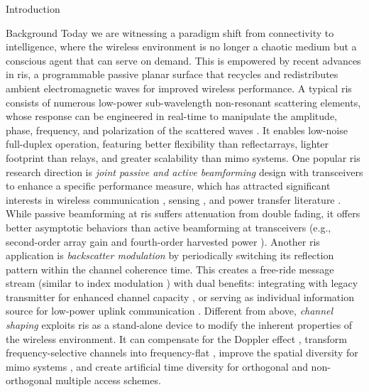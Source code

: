 \documentclass[journal]{IEEEtran}
\begin{document}
\begin{section}{Introduction}
	\begin{subsection}{Background}
		Today we are witnessing a paradigm shift from connectivity to intelligence, where the wireless environment is no longer a chaotic medium but a conscious agent that can serve on demand.
		This is empowered by recent advances in \gls{ris}, a programmable passive planar surface that recycles and redistributes ambient electromagnetic waves for improved wireless performance.
		A typical \gls{ris} consists of numerous low-power sub-wavelength non-resonant scattering elements, whose response can be engineered in real-time to manipulate the amplitude, phase, frequency, and polarization of the scattered waves \cite{Basar2019}.
		It enables low-noise full-duplex operation, featuring better flexibility than reflectarrays, lighter footprint than relays, and greater scalability than \gls{mimo} systems.
		One popular \gls{ris} research direction is \emph{joint passive and active beamforming} design with transceivers to enhance a specific performance measure, which has attracted significant interests in wireless communication \cite{Wu2019,Guo2020,Liu2022}, sensing \cite{He2022,Luo2022,Hua2023}, and power transfer literature \cite{Wu2020a,Feng2022,Zhao2022}.
		While passive beamforming at \gls{ris} suffers attenuation from double fading, it offers better asymptotic behaviors than active beamforming at transceivers (e.g., second-order array gain and fourth-order harvested power \cite{Zhao2022}).
		Another \gls{ris} application is \emph{backscatter modulation} by periodically switching its reflection pattern within the channel coherence time.
		This creates a free-ride message stream (similar to index modulation \cite{Basar2017}) with dual benefits: integrating with legacy transmitter for enhanced channel capacity \cite{Karasik2020,Basar2020,Ye2022}, or serving as individual information source for low-power uplink communication \cite{Liang2020,Zhao2024,Yang2024}.
		Different from above, \emph{channel shaping} exploits \gls{ris} as a stand-alone device to modify the inherent properties of the wireless environment.
		It can compensate for the Doppler effect \cite{Basar2021}, transform frequency-selective channels into frequency-flat \cite{Arslan2022}, improve the spatial diversity for \gls{mimo} systems \cite{Ozdogan2020a}, and create artificial time diversity for orthogonal \cite{Yang2019} and non-orthogonal \cite{Chen2023} multiple access schemes.

\end{subsection}
\end{section}
\end{document}
